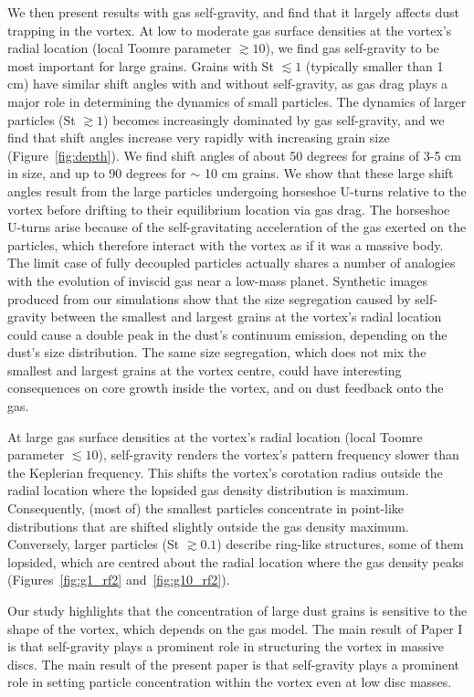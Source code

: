 \documentclass[a4paper,usenatbib]{mnras}
\begin{document}
We then present results with gas self-gravity, and find that it
largely affects dust trapping in the vortex. At low to moderate gas
surface densities at the vortex's radial location (local Toomre
parameter $\gtrsim 10$), we find gas self-gravity to be most important
for large grains. Grains with St $\lesssim 1$ (typically smaller than
1 cm) have similar shift angles with and without self-gravity, as gas
drag plays a major role in determining the dynamics of small
particles.  The dynamics of larger particles (St $\gtrsim 1$) becomes
increasingly dominated by gas self-gravity, and we find that shift
angles increase very rapidly with increasing grain size
(Figure~\ref{fig:depth}). We find shift angles of about 50 degrees for
grains of 3-5 cm in size, and up to 90 degrees for $\sim$ 10 cm
grains.  We show that these large shift angles result from the large
particles undergoing horseshoe U-turns relative to the vortex before
drifting to their equilibrium location via gas drag. The horseshoe
U-turns arise because of the self-gravitating acceleration of the gas
exerted on the particles, which therefore interact with the vortex as
if it was a massive body. The limit case of fully decoupled particles
actually shares a number of analogies with the evolution of inviscid
gas near a low-mass planet. Synthetic images produced from our
simulations show that the size segregation caused by self-gravity
between the smallest and largest grains at the vortex's radial
location could cause a double peak in the dust's continuum emission,
depending on the dust's size distribution. The same size segregation,
which does not mix the smallest and largest grains at the vortex
centre, could have interesting consequences on core growth inside the
vortex, and on dust feedback onto the gas.

At large gas surface densities at the vortex's radial location (local
Toomre parameter $\lesssim 10$), self-gravity renders the vortex's
pattern frequency slower than the Keplerian frequency.  This shifts
the vortex's corotation radius outside the radial location where the
lopsided gas density distribution is maximum. Consequently, (most of)
the smallest particles concentrate in point-like distributions that
are shifted slightly outside the gas density maximum. Conversely,
larger particles (St $\gtrsim 0.1$) describe ring-like structures,
some of them lopsided, which are centred about the radial location
where the gas density peaks (Figures~\ref{fig:g1_rf2}
and~\ref{fig:g10_rf2}).

Our study highlights that the concentration of large dust grains is
sensitive to the shape of the vortex, which depends on the gas model.
The main result of Paper I is that self-gravity plays a prominent role
in structuring the vortex in massive discs. The main result of the
present paper is that self-gravity plays a prominent role in setting
particle concentration within the vortex even at low disc masses.
\end{document}

